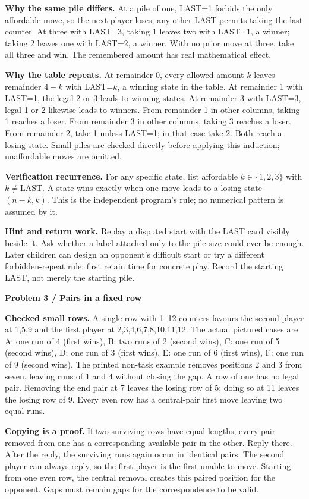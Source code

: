 \documentclass[11pt]{article}
\newcommand{\parttitle}[1]{{\large\bfseries\color{ink}#1}\par}
\newcommand{\labelled}[2]{\textbf{#1} #2\par}
\begin{document}
\labelled{Why the same pile differs.}{At a pile of one, LAST=1 forbids the only affordable move, so the next player loses; any other LAST permits taking the last counter. At three with LAST=3, taking 1 leaves two with LAST=1, a winner; taking 2 leaves one with LAST=2, a winner. With no prior move at three, take all three and win. The remembered amount has real mathematical effect.}
\labelled{Why the table repeats.}{At remainder 0, every allowed amount $k$ leaves remainder $4-k$ with LAST=$k$, a winning state in the table. At remainder 1 with LAST=1, the legal 2 or 3 leads to winning states. At remainder 3 with LAST=3, legal 1 or 2 likewise leads to winners. From remainder 1 in other columns, taking 1 reaches a loser. From remainder 3 in other columns, taking 3 reaches a loser. From remainder 2, take 1 unless LAST=1; in that case take 2. Both reach a losing state. Small piles are checked directly before applying this induction; unaffordable moves are omitted.}
\labelled{Verification recurrence.}{For any specific state, list affordable $k\in\{1,2,3\}$ with $k\ne\mathrm{LAST}$. A state wins exactly when one move leads to a losing state $(n-k,k)$. This is the independent program's rule; no numerical pattern is assumed by it.}
\labelled{Hint and return work.}{Replay a disputed start with the LAST card visibly beside it. Ask whether a label attached only to the pile size could ever be enough. Later children can design an opponent's difficult start or try a different forbidden-repeat rule; first retain time for concrete play. Record the starting LAST, not merely the starting pile.}
\newpage
\parttitle{Problem 3 / Pairs in a fixed row}
\labelled{Checked small rows.}{A single row with 1--12 counters favours the second player at 1,5,9 and the first player at 2,3,4,6,7,8,10,11,12. The actual pictured cases are A: one run of 4 (first wins), B: two runs of 2 (second wins), C: one run of 5 (second wins), D: one run of 3 (first wins), E: one run of 6 (first wins), F: one run of 9 (second wins). The printed non-task example removes positions 2 and 3 from seven, leaving runs of 1 and 4 without closing the gap. A row of one has no legal pair. Removing the end pair at 7 leaves the losing row of 5; doing so at 11 leaves the losing row of 9. Every even row has a central-pair first move leaving two equal runs.}
\labelled{Copying is a proof.}{If two surviving rows have equal lengths, every pair removed from one has a corresponding available pair in the other. Reply there. After the reply, the surviving runs again occur in identical pairs. The second player can always reply, so the first player is the first unable to move. Starting from one even row, the central removal creates this paired position for the opponent. Gaps must remain gaps for the correspondence to be valid.}
\end{document}
